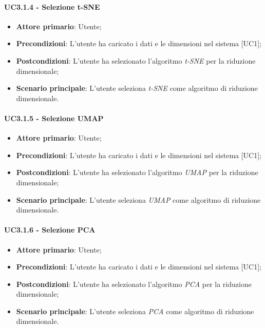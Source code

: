 \paragraph{UC3.1.4 - Selezione t-SNE}

\begin{itemize}
	\item \textbf{Attore primario}: Utente;
	\item \textbf{Precondizioni}: L'utente ha caricato i dati e le dimensioni nel sistema [UC1];
	\item \textbf{Postcondizioni}: L'utente ha selezionato l'algoritmo \textit{t-SNE} per la riduzione dimensionale;
	\item \textbf{Scenario principale}: L'utente seleziona \textit{t-SNE} come algoritmo di riduzione dimensionale.
\end{itemize}

\paragraph{UC3.1.5 - Selezione UMAP}

\begin{itemize}
	\item \textbf{Attore primario}: Utente;
	\item \textbf{Precondizioni}: L'utente ha caricato i dati e le dimensioni nel sistema [UC1];
	\item \textbf{Postcondizioni}: L'utente ha selezionato l'algoritmo \textit{UMAP} per la riduzione dimensionale;
	\item \textbf{Scenario principale}: L'utente seleziona \textit{UMAP} come algoritmo di riduzione dimensionale.
\end{itemize}

\paragraph{UC3.1.6 - Selezione PCA}

\begin{itemize}
	\item \textbf{Attore primario}: Utente;
	\item \textbf{Precondizioni}: L'utente ha caricato i dati e le dimensioni nel sistema [UC1];
	\item \textbf{Postcondizioni}: L'utente ha selezionato l'algoritmo \textit{PCA} per la riduzione dimensionale;
	\item \textbf{Scenario principale}: L'utente seleziona \textit{PCA} come algoritmo di riduzione dimensionale.
\end{itemize}
\newpage